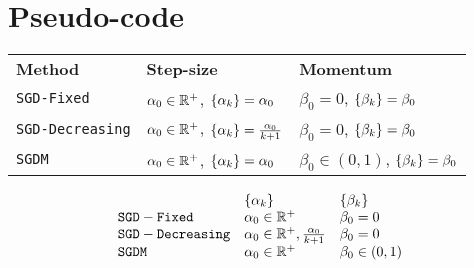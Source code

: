 \cleardoublepage
\section{Pseudo-code}\label{sc:code}

\newcommand{\forcond}{$t=0$ \KwTo $N/M-1$}
\newcommand{\shuffleDB}{create mini-batches $B_0,\dots,B_{N/M-1}$}
\newcommand{\getIdx}{get indices $i_t$ from $B_t$}
\newcommand{\algGrad}{$\nabla f_{i_t}(y_t) \gets \frac{1}{M}\sum_{j\in B_t}\nabla f_j(y_t)$}


\begin{tabularx}{0.7\textwidth}{lll}
\textbf{Method} & \textbf{Step-size} & \textbf{Momentum} \\
\texttt{SGD-Fixed} & $\alpha_0\in\mathbb{R}^+$, $\{\alpha_k\}=\alpha_0$ & $\beta_0=0$, $\{\beta_k\}=\beta_0$ \\
\texttt{SGD-Decreasing} & $\alpha_0\in\mathbb{R}^+$, $\{\alpha_k\}=\frac{\alpha_0}{k+1}$ & $\beta_0=0$, $\{\beta_k\}=\beta_0$ \\
\texttt{SGDM} & $\alpha_0\in\mathbb{R}^+$, $\{\alpha_k\}=\alpha_0$ & $\beta_0\in(0,1)$, $\{\beta_k\}=\beta_0$ \\
\end{tabularx}

\[
\begin{array}{lll}
 & \{\alpha_k\} & \{\beta_k\} \\
\mathtt{SGD-Fixed} & \alpha_0\in\mathbb{R}^+ & \beta_0=0 \\
\mathtt{SGD-Decreasing} & \alpha_0\in\mathbb{R}^+,\frac{\alpha_0}{k+1} & \beta_0=0 \\
\mathtt{SGDM} & \alpha_0\in\mathbb{R}^+ & \beta_0\in(0,1) \\
\end{array}
\]

